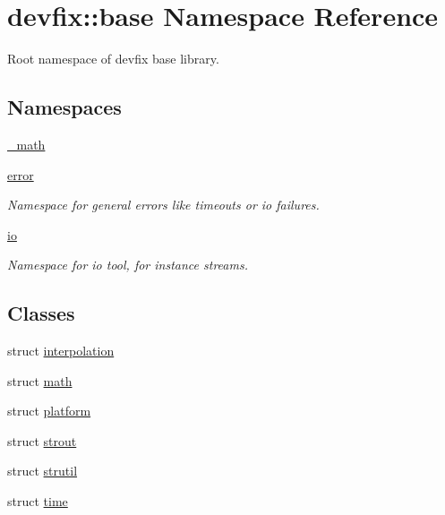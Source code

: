 \hypertarget{namespacedevfix_1_1base}{}\section{devfix\+:\+:base Namespace Reference}
\label{namespacedevfix_1_1base}


Root namespace of devfix base library.  


\subsection*{Namespaces}
\begin{DoxyCompactItemize}
\item 
 \hyperlink{namespacedevfix_1_1base_1_1__math}{\+\_\+math}
\item 
 \hyperlink{namespacedevfix_1_1base_1_1error}{error}
\begin{DoxyCompactList}\small\item\em Namespace for general errors like timeouts or io failures. \end{DoxyCompactList}\item 
 \hyperlink{namespacedevfix_1_1base_1_1io}{io}
\begin{DoxyCompactList}\small\item\em Namespace for io tool, for instance streams. \end{DoxyCompactList}\end{DoxyCompactItemize}
\subsection*{Classes}
\begin{DoxyCompactItemize}
\item 
struct \hyperlink{structdevfix_1_1base_1_1interpolation}{interpolation}
\item 
struct \hyperlink{structdevfix_1_1base_1_1math}{math}
\item 
struct \hyperlink{structdevfix_1_1base_1_1platform}{platform}
\item 
struct \hyperlink{structdevfix_1_1base_1_1strout}{strout}
\item 
struct \hyperlink{structdevfix_1_1base_1_1strutil}{strutil}
\item 
struct \hyperlink{structdevfix_1_1base_1_1time}{time}
\end{DoxyCompactItemize}
